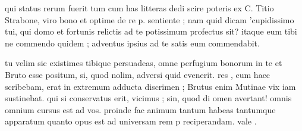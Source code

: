 


 qui status rerum fuerit tum cum has litteras dedi scire poteris ex C. Titio Strabone, viro bono et optime de re p. sentiente ; nam quid dicam 'cupidissimo tui, qui domo et fortunis relictis ad te potissimum profectus sit? itaque eum tibi ne commendo quidem ; adventus ipsius ad te satis eum commendabit.

 tu velim sic existimes tibique persuadeas, omne perfugium bonorum in te et Bruto esse positum, si, quod nolim, adversi quid evenerit. res , cum haec scribebam, erat in extremum adducta discrimen ; Brutus enim Mutinae vix iam sustinebat. qui si conservatus erit, vicimus ; sin, quod di omen avertant! omnis omnium cursus est ad vos. proinde fac animum tantum habeas tantumque apparatum quanto opus est ad universam rem p reciperandam. vale .
